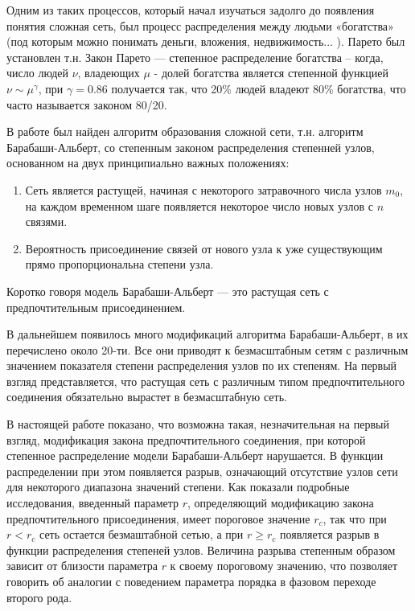 \documentclass[10pt,aps,pra]{revtex4-1}
\begin{document}
    Одним из таких процессов, который начал изучаться задолго до появления понятия сложная сеть, был процесс распределения между людьми «богатства» (под которым можно понимать деньги, вложения, недвижимость... ). Парето был установлен т.н. Закон Парето \cite{Pareto} — степенное распределение богатства – когда, число людей $\nu$, владеющих $\mu$ - долей богатства является степенной функцией $\nu \sim \mu^\gamma$, при $\gamma=0.86$ получается так, что 20\% людей владеют 80\% богатства, что часто называется законом 80/20. 

    В работе \cite{AlBa1} был найден алгоритм образования сложной сети, т.н. алгоритм Барабаши-Альберт, со степенным законом распределения степенней узлов, основанном на двух принципиально важных положениях:
        \begin{enumerate} 
            \item Сеть является растущей, начиная с некоторого затравочного числа узлов $m_0$, на каждом временном шаге появляется некоторое число новых узлов с $n$ связями.
            \item Вероятность присоединение связей от нового узла к уже существующим прямо пропорциональна степени узла.
        \end{enumerate}
    Коротко говоря модель Барабаши-Альберт — это растущая сеть с предпочтительным присоединением.

    В дальнейшем появилось много модификаций алгоритма Барабаши-Альберт, в \cite{AlBa2} их перечислено около 20-ти. Все они приводят к безмасштабным сетям с различным значением показателя степени распределения узлов по их степеням. На первый взгляд представляется, что растущая сеть с различным типом предпочтительного соединения обязательно вырастет в безмасштабную сеть.

    В настоящей работе показано, что возможна такая, незначительная на первый взгляд, модификация закона предпочтительного соединения, при которой степенное распределение модели Барабаши-Альберт нарушается. В функции распределении при этом появляется разрыв, означающий отсутствие узлов сети для некоторого диапазона значений степени. Как показали подробные исследования, введенный параметр $r$, определяющий модификацию закона предпочтительного присоединения, имеет пороговое значение $r_c$, так что при $r<r_c$ сеть остается безмаштабной сетью, а при $r \geq r_c$ появляется разрыв в функции распределения степеней узлов. Величина разрыва степенным образом зависит от близости параметра $r$ к своему пороговому значению, что позволяет говорить об аналогии с поведением параметра порядка в фазовом переходе второго рода.
\end{document}
